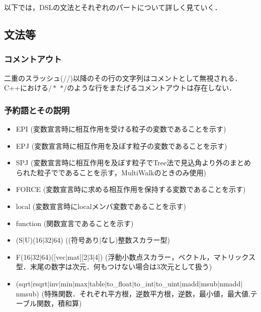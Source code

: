 \documentclass{article}
\begin{document}
 以下では，DSLの文法とそれぞれのパートについて詳しく見ていく．

 \subsection{文法等}
 \subsubsection{コメントアウト}
 二重のスラッシュ(//)以降のその行の文字列はコメントとして無視される．C++における$/*$ $*/$のような行をまたげるコメントアウトは存在しない．

 \subsubsection{予約語とその説明}
 \begin{itemize}
  \item EPI (変数宣言時に相互作用を受ける粒子の変数であることを示す)
  \item EPJ (変数宣言時に相互作用を及ぼす粒子の変数であることを示す)
  \item SPJ (変数宣言時に相互作用を及ぼす粒子でTree法で見込角より外のまとめられた粒子でであることを示す，MultiWalkのときのみ使用)
  \item FORCE (変数宣言時に求める相互作用を保持する変数であることを示す)
  \item local (変数宣言時にlocalメンバ変数であることを示す)
  \item function (関数宣言であることを示す)
  \item (S$|$U)(16$|$32$|$64) ((符号あり$|$なし)整数スカラー型)
  \item F(16$|$32$|$64)([vec$|$mat][2$|$3$|$4]) (浮動小数点スカラー，ベクトル，マトリックス型．末尾の数字は次元．何もつけない場合は3次元として扱う)
  \item (sqrt$|$rsqrt$|$inv$|$min$|$max$|$table$|$to\_float$|$to\_int$|$to\_uint$|$madd$|$msub$|$nmadd$|$nmsub) (特殊関数．それぞれ平方根，逆数平方根，逆数，最小値，最大値,テーブル関数，積和算)
 \end{itemize}
\end{document}
